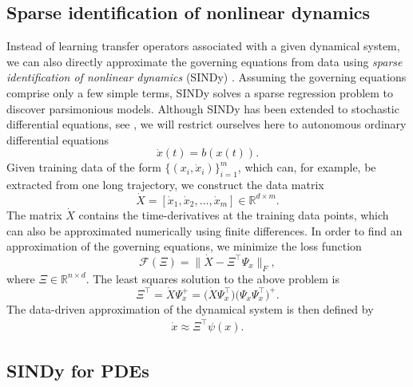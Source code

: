 \documentclass
[
    a4paper,
    DIV=11,
    abstract=true,
    11pt,
]
{scrartcl}
\newcommand{\R}{\mathbb{R}}                                      %
\theoremstyle{definition}
\begin{document}
\subsection{Sparse identification of nonlinear dynamics}

Instead of learning transfer operators associated with a given dynamical system, we can also directly approximate the governing equations from data using \emph{sparse identification of nonlinear dynamics} (SINDy) \cite{brunton2016discovering}. Assuming the governing equations comprise only a few simple terms, SINDy solves a sparse regression problem to discover parsimonious models. Although SINDy has been extended to stochastic differential equations, see \cite{BNC18, KNPNCS20}, we will restrict ourselves here to autonomous ordinary differential equations
\begin{equation*}
    \dot{x}(t) = b(x(t)).
\end{equation*}
Given training data of the form $ \{ (x_i, \dot{x}_i) \}_{i=1}^m $, which can, for example, be extracted from one long trajectory, we construct the data matrix
\begin{equation*}
    \dot{X} = [\dot{x}_1, \dot{x}_2, \dots, \dot{x}_m] \in \R^{d \times m}.
\end{equation*}
The matrix $\dot{X}$ contains the time-derivatives at the training data points, which can also be approximated numerically using finite differences. In order to find an approximation of the governing equations, we minimize the loss function
\begin{equation*}
    \mathcal{F}(\Xi) = \big \| \dot{X} - \Xi^{\top}\Psi_x \big \|_F,
\end{equation*}
where $ \Xi \in \R^{n \times d} $. The least squares solution to the above problem is
\begin{equation*}
    \Xi^\top = \dot{X}\Psi_x^+ = \big(\dot{X}\Psi_x^\top\big)\big(\Psi_x\Psi_x^\top\big)^+.
\end{equation*}
The data-driven approximation of the dynamical system is then defined by
\begin{align*}
    \dot{x} \approx \Xi^{\top}\psi(x).
\end{align*}

\subsection{SINDy for PDEs}
\end{document}
